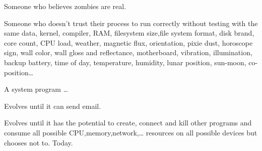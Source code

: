 Someone who believes zombies are real.

Someone who doesn't trust their process to run correctly without testing with the same data, kernel, compiler, RAM, filesystem size,file system format, disk brand, core count, CPU load, weather, magnetic flux, orientation, pixie dust, horoscope sign, wall color, wall gloss and reflectance, motherboard, vibration, illumination, backup battery, time of day, temperature, humidity, lunar position, sun-moon, co-position\ldots{}

A system program \ldots{}

Evolves until it can send email.

Evolves until it has the potential to create, connect and kill other programs and consume all possible CPU,memory,network,\ldots{} resources on all possible devices but chooses not to. Today.
